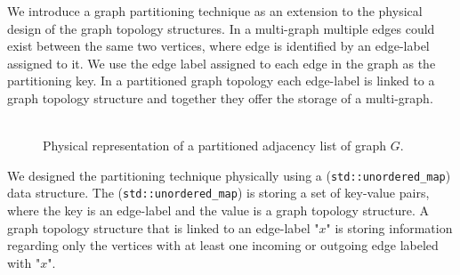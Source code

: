 {We introduce a graph partitioning technique as an extension to the physical design of the graph topology structures. In a multi-graph multiple edges could exist between the same two vertices, where edge is identified by an edge-label assigned to it. We use the edge label assigned to each edge in the graph as the partitioning key. In a partitioned graph topology each edge-label is linked to a graph topology structure and together they offer the storage of a multi-graph. \\\\

\begin{figure}[H]
\centering
\centering
    \caption{Physical representation of a partitioned adjacency list of graph $G$.}
    \label{fig:GraphPartitioning_physical}
\end{figure}


We designed the partitioning technique physically using a (\texttt{std::unordered\_map}) data structure. The (\texttt{std::unordered\_map}) is storing a set of key-value pairs, where the key is an edge-label and the value is a graph topology structure. A graph topology structure that is linked to an edge-label "$x$" is storing information regarding only the vertices with at least one incoming or outgoing edge labeled with "$x$".

}

